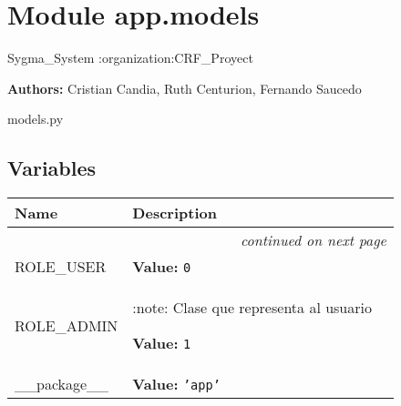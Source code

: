 %
%
%


\section{Module app.models}

    \label{app:models}
Sygma\_System :organization:CRF\_Proyect

\textbf{Authors:}
Cristian Candia,
    Ruth Centurion,
    Fernando Saucedo

models.py



  \subsection{Variables}

    \vspace{-1cm}
\hspace{\varindent}\begin{longtable}{|p{\varnamewidth}|p{\vardescrwidth}|l}
\cline{1-2}
\cline{1-2} \centering \textbf{Name} & \centering \textbf{Description}& \\
\cline{1-2}
\endhead\cline{1-2}\multicolumn{3}{r}{\small\textit{continued on next page}}\\\endfoot\cline{1-2}
\endlastfoot\raggedright R\-O\-L\-E\-\_\-U\-S\-E\-R\- & \raggedright \textbf{Value:} 
{\tt 0}&\\
\cline{1-2}
\raggedright R\-O\-L\-E\-\_\-A\-D\-M\-I\-N\- & \raggedright :note: Clase que representa al usuario

\textbf{Value:} 
{\tt 1}&\\
\cline{1-2}
\raggedright \_\-\_\-p\-a\-c\-k\-a\-g\-e\-\_\-\_\- & \raggedright \textbf{Value:} 
{\tt \texttt{'}\texttt{app}\texttt{'}}&\\
\cline{1-2}
\end{longtable}


